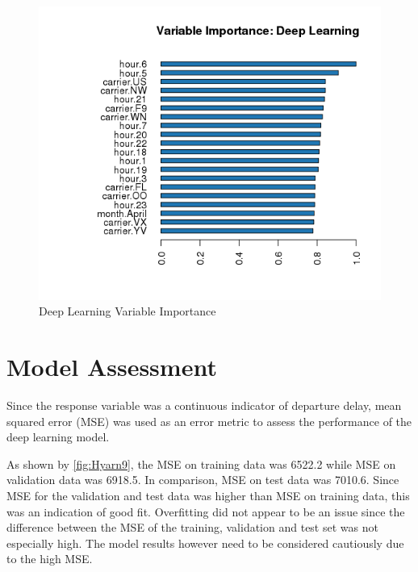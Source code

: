 \documentclass[12pt,twoside]{amherstthesis}
\begin{document}
  \begin{figure}[htbp]
  \centering
  \includegraphics[scale = 1,angle = 0]{figure/VarImpDeep.png}
  \caption[Deep Learning Variable Importance]{\normalsize{Deep Learning Variable Importance}}
  \label{fig:Hyarn81}
  \end{figure}
  
  \clearpage 
  
  \section{Model Assessment}\label{model-assessment-2}
  
  Since the response variable was a continuous indicator of departure
  delay, mean squared error (MSE) was used as an error metric to assess
  the performance of the deep learning model.
  
  As shown by \autoref{fig:Hyarn9}, the MSE on training data was 6522.2
  while MSE on validation data was 6918.5. In comparison, MSE on test data
  was 7010.6. Since MSE for the validation and test data was higher than
  MSE on training data, this was an indication of good fit. Overfitting
  did not appear to be an issue since the difference between the MSE of
  the training, validation and test set was not especially high. The model
  results however need to be considered cautiously due to the high MSE.
  
  \begin{Shaded}
  \begin{Highlighting}[]
   \NormalTok{)  }
   \NormalTok{)  }
   
  \end{Highlighting}
  \end{Shaded}
  
\end{document}
